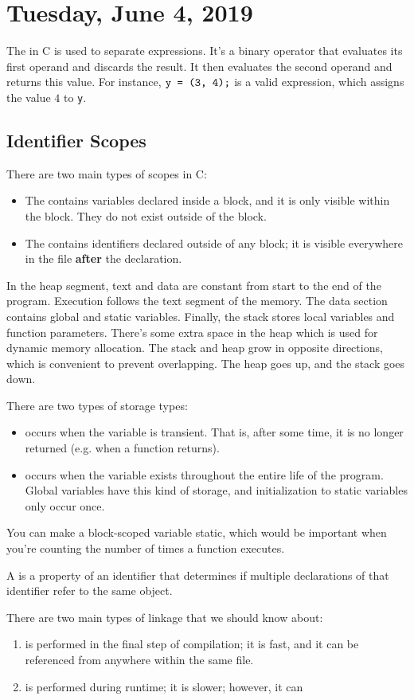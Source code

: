 \section{Tuesday, June 4, 2019}
The  in C is used to separate expressions. It's a binary operator that evaluates its first operand and discards the result. It then evaluates the second operand and returns this value. For instance, $\verb!y = (3, 4);!$ is a valid expression, which assigns the value $4$ to \verb!y!. 

\subsection{Identifier Scopes}
There are two main types of scopes in C: \begin{itemize}
    \item The  contains variables declared inside a block, and it is only visible within the block. They do not exist outside of the block.
    \item The  contains identifiers declared outside of any block; it is visible everywhere in the file \textbf{after} the declaration.
\end{itemize}


In the heap segment, text and data are constant from start to the end of the program. Execution follows the text segment of the memory. The data section contains global and static variables. Finally, the stack stores local variables and function parameters. There's some extra space in the heap which is used for dynamic memory allocation. The stack and heap grow in opposite directions, which is convenient to prevent overlapping. The heap goes up, and the stack goes down.


There are two types of storage types: \begin{itemize}
    \item {} occurs when the variable is transient. That is, after some time, it is no longer returned (e.g. when a function returns).
    \item {} occurs when the variable exists throughout the entire life of the program. Global variables have this kind of storage, and initialization to static variables only occur once.
\end{itemize}
You can make a block-scoped variable static, which would be important when you're counting the number of times a function executes.



A  is a property of an identifier that determines if multiple declarations of that identifier refer to the same object.  

There are two main types of linkage that we should know about: \begin{enumerate}
    \item {} is performed in the final step of compilation; it is fast, and it can be referenced from anywhere within the same file.
    \item {} is performed during runtime; it is slower; however, it can
\end{enumerate}